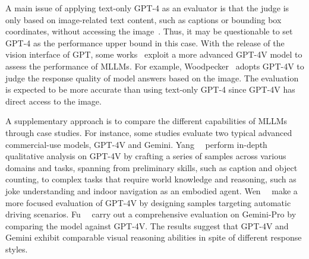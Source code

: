 A main issue of applying text-only GPT-4 as an evaluator is that the judge is only based on image-related text content, such as captions or bounding box coordinates, without accessing the image~\cite{llava-med}. 
Thus, it may be questionable to set GPT-4 as the performance upper bound in this case. With the release of the vision interface of GPT, some works~\cite{yin2023woodpecker, li2024red} exploit a more advanced GPT-4V model to assess the performance of MLLMs. For example, Woodpecker~\cite{yin2023woodpecker} adopts GPT-4V to judge the response quality of model answers based on the image. The evaluation is expected to be more accurate than using text-only GPT-4 since GPT-4V has direct access to the image.

A supplementary approach is to compare the different capabilities of MLLMs through case studies.
For instance, some studies evaluate two typical advanced commercial-use models, GPT-4V and Gemini. 
Yang~\etal~\cite{yang2023dawn} perform in-depth qualitative analysis on GPT-4V by crafting a series of samples across various domains and tasks, spanning from preliminary skills, such as caption and object counting, to complex tasks that require world knowledge and reasoning, such as joke understanding and indoor navigation as an embodied agent. 
Wen~\etal~\cite{wen2023road} make a more focused evaluation of GPT-4V by designing samples targeting automatic driving scenarios.
Fu~\etal~\cite{fu2023challenger} carry out a comprehensive evaluation on Gemini-Pro by comparing the model against GPT-4V. The results suggest that GPT-4V and Gemini exhibit comparable visual reasoning abilities in spite of different response styles.
